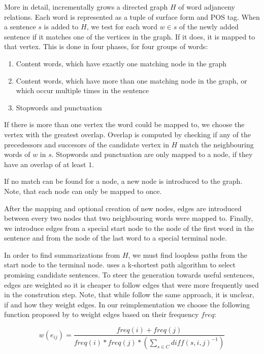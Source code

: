 \documentclass[a4paper,BCOR=10mm]{report}
\numberwithin{lemma}{chapter}
\numberwithin{definition}{chapter}
\begin{document}
More in detail, \citeauthor{filippova} incrementally grows a directed graph $H$ of word adjanceny relations. Each word is represented as a tuple of surface form and POS tag. When a sentence $s$ is added to $H$, we test for each word $w \in s$ of the newly added sentence if it matches one of the vertices in the graph. If it does, it is mapped to that vertex. This is done in four phases, for four groups of words:

\begin{enumerate}
\item{Content words, which have exactly one matching node in the graph}
\item{Content words, which have more than one matching node in the graph, or which occur multiple times in the sentence}
\item{Stopwords and punctuation} %
\end{enumerate}

If there is more than one vertex the word could be mapped to, we choose the vertex with the greatest overlap. Overlap is computed by checking if any of the precedessors and succesors of the candidate vertex in $H$ match the neighbouring words of $w$ in $s$.
Stopwords and punctuation are only mapped to a node, if they have an overlap of at least $1$.

If no match can be found for a node, a new node is introduced to the graph. Note, that each node can only be mapped to once.

After the mapping and optional creation of new nodes, edges are introduced between every two nodes that two neighbouring words were mapped to.
Finally, we introduce edges from a special start node to the node of the first word in the sentence and from the node of the last word to a special terminal node.

In order to find summarizations from $H$, we must find loopless paths from the start node to the terminal node. \citet{filippova} uses a k-shortest path algorithm to select promising candidate sentences. To steer the generation towards useful sentences, edges are weighted so it is cheaper to follow edges that were more frequently used in the constrution step. Note, that while \citeauthor{banerjee} follow the same approach, it is unclear, if and how they weight edges.
In our reimplementation we choose the following function proposed by \citeauthor{filippova} to weight edges based on their frequency $\mathit{freq}$:

\begin{equation}
w(e_{ij}) = \frac{\mathit{freq}(i) + \mathit{freq}(j)} {\mathit{freq}(i) * \mathit{freq}(j) * (\sum_{s \in C} \mathit{diff}(s, i, j)^{-1})}
\end{equation}
\end{document}
